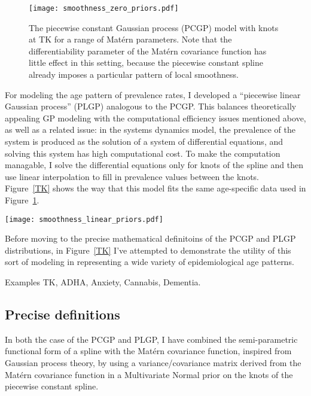 \begin{figure}
\begin{center}
\texttt{[image: smoothness\_zero\_priors.pdf]}
\end{center}
\caption{The piecewise constant Gaussian process (PCGP) model with
  knots at TK for a range of Mat\'{e}rn parameters.  Note that the
  differentiability parameter of the Mat\'{e}rn covariance function
  has little effect in this setting, because the piecewise constant
  spline already imposes a particular pattern of local smoothness.}
\label{TK1}
\end{figure}

For modeling the age pattern of prevalence rates, I developed a
``piecewise linear Gaussian process'' (PLGP) analogous to the
PCGP. This balances theoretically appealing GP modeling with the
computational efficiency issues mentioned above, as well as a related
issue: in the systems dynamics model, the prevalence of the system is
produced as the solution of a system of differential equations, and
solving this system has high computational cost.  To make the
computation managable, I solve the differential equations only for
knots of the spline and then use linear interpolation to fill in
prevalence values between the knots.  Figure~\ref{TK} shows the way
that this model fits the same age-specific data used in
Figure~\ref{TK1}.

\begin{center}
\texttt{[image: smoothness\_linear\_priors.pdf]}
\end{center}

Before moving to the precise mathematical definitoins of the PCGP and
PLGP distributions, in Figure~\ref{TK} I've attempted to demonstrate
the utility of this sort of modeling in representing a wide variety of
epidemiological age patterns.

Examples TK, ADHA, Anxiety, Cannabis, Dementia.

\subsection{Precise definitions}
In both the case of the PCGP and PLGP, I have combined the
semi-parametric functional form of a spline with the Mat\'{e}rn
covariance function, inspired from Gaussian process theory, by using a
variance/covariance matrix derived from the Mat\'{e}rn covariance function
in a Multivariate Normal prior on the knots of the piecewise constant
spline.

